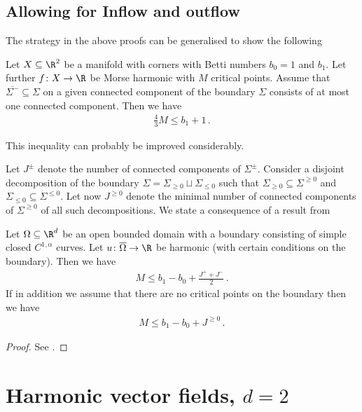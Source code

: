 \subsection{Allowing for Inflow and outflow}

The strategy in the above proofs can be generalised to show the following
\begin{conjecture}
  Let $X\subseteq\R^2$ be a manifold with corners with Betti numbers $b_0=1$ and $b_1$.
  Let further $f\colon X\to\R$ be Morse harmonic with $M$ critical points.
  Assume that 
  $\overline{\Sigma^-}\subseteq\Sigma$ on a given connected component 
  of the boundary $\Sigma$
  consists of at most one connected component. Then we have
  \begin{align*}
    \frac{4}{3}M\leq b_1+1\,.
  \end{align*}
\end{conjecture}
This inequality can probably be improved considerably.

Let $J^\pm$ denote the number of connected components of $\Sigma^\pm$.
Consider a disjoint decomposition of the boundary $\Sigma=\Sigma_{\geq0}\sqcup\Sigma_{\leq0}$ such
that $\Sigma_{\geq0}\subseteq\Sigma^{\geq0}$ and $\Sigma_{\leq0}\subseteq\Sigma^{\leq0}$.
Let now $J^{\geq0}$ denote the minimal number of connected components of $\Sigma^{\geq0}$ of all such
decompositions.
We state a consequence of a result from \cite[Theorem 2.1]{Alessandrini1992}
\begin{proposition} 
  Let $\Omega\subseteq\R^d$ be an open bounded domain with a boundary consisting of simple closed $C^{1,\alpha}$ curves.
  Let $u\colon \overline{\Omega}\to \R$ be harmonic (with certain conditions on the boundary).
  Then we have
  \begin{align*}
    M\leq b_1-b_0+\frac{J^++J^-}{2}\,.
  \end{align*}
  If in addition we assume that there are no critical points on the boundary then we have
  \begin{align*}
    M\leq b_1-b_0+J^{\geq0}\,.
  \end{align*}
\end{proposition}
\begin{proof}
  See \cite[Theorem 2.1]{Alessandrini1992}.
\end{proof}

\newpage

\section{Harmonic vector fields, $d=2$}


